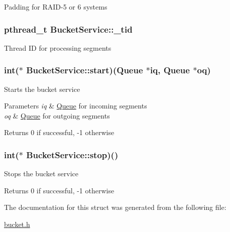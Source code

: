 \-Padding for \-R\-A\-I\-D-\/5 or 6 systems \hypertarget{structBucketService_ac327842d72641c82f4c290b02fc84878}{
\subsubsection[{\-\_\-tid}]{\setlength{\rightskip}{0pt plus 5cm}pthread\-\_\-t {\bf \-Bucket\-Service\-::\-\_\-tid}}}\label{structBucketService_ac327842d72641c82f4c290b02fc84878}
\-Thread \-I\-D for processing segments \hypertarget{structBucketService_a8325d65e9932e641e2785418d2307f8e}{
\subsubsection[{start}]{\setlength{\rightskip}{0pt plus 5cm}int($\ast$ {\bf \-Bucket\-Service\-::start})({\bf \-Queue} $\ast$iq, {\bf \-Queue} $\ast$oq)}}\label{structBucketService_a8325d65e9932e641e2785418d2307f8e}
\-Starts the bucket service 
\begin{DoxyParams}{\-Parameters}
{\em iq} & \hyperlink{structQueue}{\-Queue} for incoming segments \\
\hline
{\em oq} & \hyperlink{structQueue}{\-Queue} for outgoing segments \\
\hline
\end{DoxyParams}
\begin{DoxyReturn}{\-Returns}
0 if successful, -\/1 otherwise 
\end{DoxyReturn}
\hypertarget{structBucketService_a4f11f738d391bcfedab49713e25d19a0}{
\subsubsection[{stop}]{\setlength{\rightskip}{0pt plus 5cm}int($\ast$ {\bf \-Bucket\-Service\-::stop})()}}\label{structBucketService_a4f11f738d391bcfedab49713e25d19a0}
\-Stops the bucket service \begin{DoxyReturn}{\-Returns}
0 if successful, -\/1 otherwise 
\end{DoxyReturn}


\-The documentation for this struct was generated from the following file\-:\begin{DoxyCompactItemize}
\item 
\hyperlink{bucket_8h}{bucket.\-h}\end{DoxyCompactItemize}
